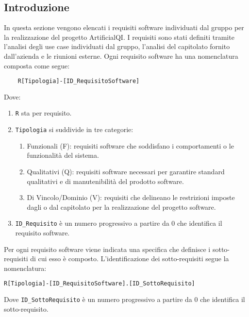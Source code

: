 
\subsection{Introduzione}
\label{sec:introduzione_requisiti_software}
In questa sezione vengono elencati i requisiti software individuati dal gruppo per la realizzazione del progetto ArtificialQI.
I requisiti sono stati definiti tramite l'analisi degli use case individuati dal gruppo, l'analisi del capitolato fornito dall'azienda e le riunioni esterne.
Ogni requisito software ha una nomenclatura composta come segue:
\begin{lstlisting}
    R[Tipologia]-[ID_RequisitoSoftware]
\end{lstlisting}
Dove:
\begin{enumerate}
    \item \lstinline|R| sta per requisito.
    \item \lstinline|Tipologia| si suddivide in tre categorie:
    \begin{enumerate}
        \item Funzionali (F): requisiti software che soddisfano i comportamenti o le funzionalità del sistema.
        \item Qualitativi (Q): requisiti software necessari per garantire standard qualitativi e di manutenibilità
        del prodotto software.
        \item Di Vincolo/Dominio (V): requisiti che delineano le restrizioni imposte dagli  o dal capitolato 
        per la realizzazione del progetto software.
    \end{enumerate}
    \item \lstinline|ID_Requisito| è un numero progressivo a partire da 0 che identifica il requisito software.
\end{enumerate}  
Per ogni requisito software viene indicata una specifica che definisce i sotto-requisiti di cui esso è composto.
L'identificazione dei sotto-requisiti segue la nomenclatura:
\begin{lstlisting}
R[Tipologia]-[ID_RequisitoSoftware].[ID_SottoRequisito]
\end{lstlisting} 
Dove \lstinline|ID_SottoRequisito| è un numero progressivo a partire da 0 che identifica il sotto-requisito.

